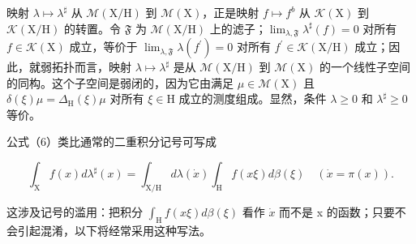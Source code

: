 映射 \(\lambda \mapsto \lambda^{\sharp}\) 从 \(\mathcal{M}(\mathrm{X / H})\) 到 \(\mathcal{M}(\mathrm{X})\)，正是映射 \(f\mapsto f^{b}\) 从 \(\mathcal{K}(\mathrm{X})\) 到 \(\mathcal{K}(\mathrm{X / H})\) 的转置。令 \(\mathfrak{F}\) 为 \(\mathcal{M}(\mathrm{X / H})\) 上的滤子；\(\lim_{\lambda ,\mathfrak{F}}\lambda^{\sharp}(f) = 0\) 对所有 \(f\in \mathcal{K}(\mathrm{X})\) 成立，等价于 \(\lim_{\lambda ,\mathfrak{F}}\lambda (f^{\prime}) = 0\) 对所有 \(f^{\prime}\in \mathcal{K}(\mathrm{X / H})\) 成立；因此，就弱拓扑而言，映射 \(\lambda \mapsto \lambda^{\sharp}\) 是从 \(\mathcal{M}(\mathrm{X / H})\) 到 \(\mathcal{M}(\mathrm{X})\) 的一个线性子空间的同构。这个子空间是弱闭的，因为它由满足 \(\mu \in \mathcal{M}(\mathrm{X})\) 且 \(\delta (\xi)\mu = \Delta_{\mathrm{H}}(\xi)\mu\) 对所有 \(\xi \in \mathrm{H}\) 成立的测度组成。显然，条件 \(\lambda \geqslant 0\) 和 \(\lambda^{\sharp}\geqslant 0\) 等价。

公式（6）类比通常的二重积分记号可写成

\[
\int_ {\mathrm{X}} f (x) d \lambda^ {\sharp} (x) = \int_ {\mathrm{X/H}} d \lambda (\dot {x}) \int_ {\mathrm{H}} f (x \xi) d \beta (\xi) \quad (\dot {x} = \pi (x)).\tag{7}
\]

这涉及记号的滥用：把积分 \(\int_{\mathrm{H}} f(x\xi) d\beta(\xi)\) 看作 \(\dot{x}\) 而不是 x 的函数；只要不会引起混淆，以下将经常采用这种写法。
\relax{}
